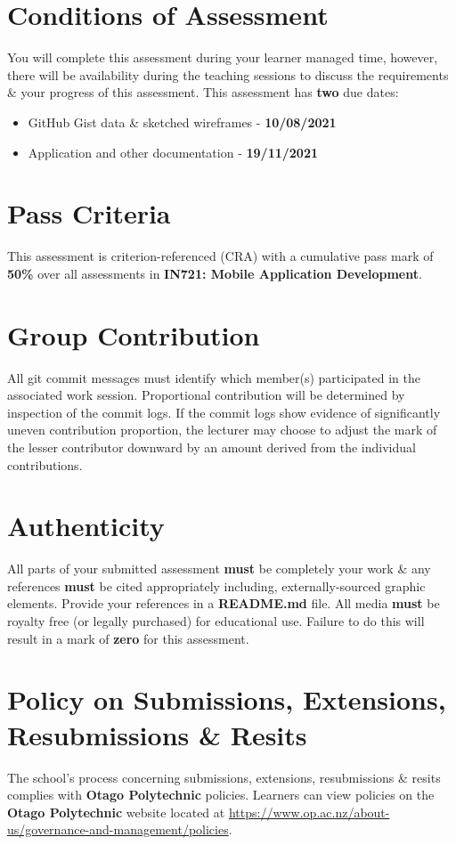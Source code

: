 \documentclass{article}
\begin{document}
\section*{Conditions of Assessment}
You will complete this assessment during your learner managed time, however, there will be availability during the teaching sessions to discuss the requirements \& your progress of this assessment. This assessment has \textbf{two} due dates:
\begin{itemize}
	\item GitHub Gist data \& sketched wireframes - \textbf{10/08/2021}
	\item Application and other documentation - \textbf{19/11/2021}
\end{itemize}

\section*{Pass Criteria}
This assessment is criterion-referenced (CRA) with a cumulative pass mark of \textbf{50\%} over all assessments in \textbf{IN721: Mobile Application Development}.

\section*{Group Contribution}
All git commit messages must identify which member(s) participated in the associated work session. Proportional contribution will be determined by inspection of the commit logs. If the commit logs show evidence of significantly uneven contribution proportion, the lecturer may choose to adjust the mark of the lesser contributor downward by an amount derived from the individual contributions.

\section*{Authenticity}
All parts of your submitted assessment \textbf{must} be completely your work \& any references \textbf{must} be cited appropriately including, externally-sourced graphic elements. Provide your references in a \textbf{README.md} file. All media \textbf{must} be royalty free (or legally purchased) for educational use. Failure to do this will result in a mark of \textbf{zero} for this assessment.

\section*{Policy on Submissions, Extensions, Resubmissions \& Resits}
The school's process concerning submissions, extensions, resubmissions \& resits complies with \textbf{Otago Polytechnic} policies. Learners can view policies on the \textbf{Otago Polytechnic} website located at \href{https://www.op.ac.nz/about-us/governance-and-management/policies}{https://www.op.ac.nz/about-us/governance-and-management/policies}.
\end{document}
